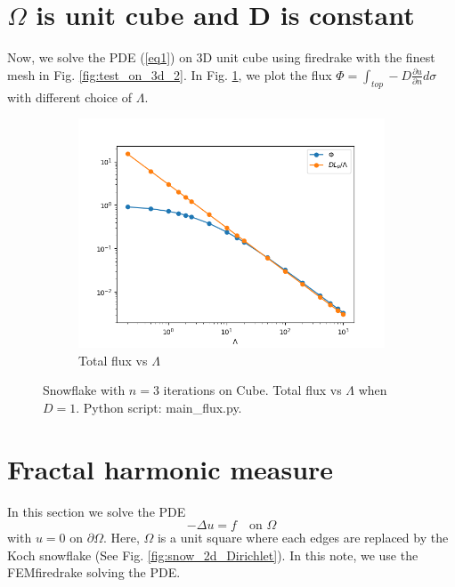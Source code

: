 \documentclass[12pt]{article}%
\theoremstyle{plain}
\numberwithin{equation}{section}
\begin{document}
\section{$\Omega$ is unit cube and D is constant}
Now, we solve the PDE (\ref{eq1}) on 3D unit cube using firedrake with the finest mesh in Fig. \ref{fig:test_on_3d_2}. In Fig. \ref{flux_cube}, we plot the flux $\Phi=\int_{top}-D\frac{\partial u}{\partial n}d\sigma$ with different choice of $\Lambda$.
  \begin{figure}[H]%
    \centering
 \begin{subfigure}[h]{0.45\linewidth}
         \caption{Total flux vs $\Lambda$}
\includegraphics[width=\linewidth]{figures/Ex2/Phi_Lam_cube.png}
\end{subfigure}
  \caption{Snowflake with $n=3$ iterations on Cube. Total flux vs $\Lambda$ when $D=1$. Python script: main\_flux.py.}
  \label{flux_cube}
 \end{figure}



\section{Fractal harmonic measure}
In this section we solve the PDE 
\begin{equation}
-\Delta u =f \quad\text{on }\Omega
\label{eqn:Ex3}
\end{equation}
with $u=0$ on $\partial \Omega$. Here, $\Omega$ is a unit square where each edges are replaced by the Koch snowflake (See Fig. \ref{fig:snow_2d_Dirichlet}). In this note, we use the FEMfiredrake solving the PDE. 
\end{document}
